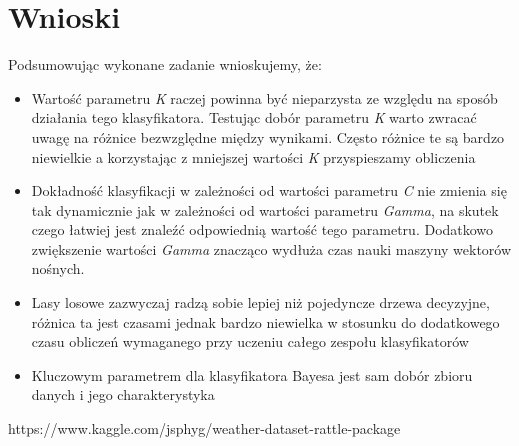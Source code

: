 \documentclass{classrep}
\begin{document}
    \section{Wnioski}
    \label{conclusions} {
        Podsumowując wykonane zadanie wnioskujemy, że:
        \begin{itemize}
            \item Wartość parametru \textit{K} raczej powinna być nieparzysta ze względu
            na sposób działania tego klasyfikatora. Testując dobór parametru \textit{K}
            warto zwracać uwagę na różnice bezwzględne między wynikami. Często różnice te są
            bardzo niewielkie a korzystając z mniejszej wartości \textit{K}
            przyspieszamy obliczenia
            \item Dokładność klasyfikacji w zależności od wartości parametru \emph{C} nie zmienia się tak dynamicznie jak w zależności od wartości parametru \emph{Gamma}, na skutek czego łatwiej jest znaleźć odpowiednią wartość tego parametru. Dodatkowo zwiększenie wartości \emph{Gamma} znacząco wydłuża czas nauki maszyny wektorów nośnych.
            \item Lasy losowe zazwyczaj radzą sobie lepiej niż pojedyncze drzewa decyzyjne, różnica ta jest czasami jednak bardzo niewielka w stosunku do dodatkowego czasu obliczeń wymaganego przy uczeniu całego zespołu klasyfikatorów
            \item Kluczowym parametrem dla klasyfikatora Bayesa jest sam dobór zbioru danych i jego charakterystyka
        \end{itemize}
    }

    \begin{thebibliography}{0}
        {https://www.kaggle.com/jsphyg/weather-dataset-rattle-package}
    \end{thebibliography}
\end{document}
